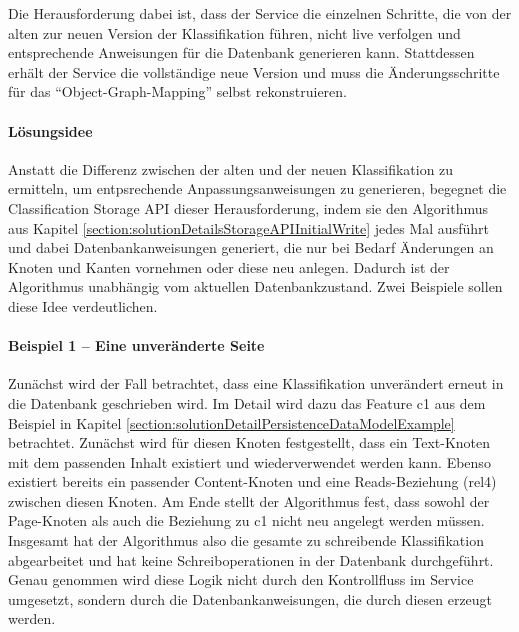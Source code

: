     Die Herausforderung dabei ist, dass der Service
    die einzelnen Schritte, die von der alten zur neuen Version der Klassifikation
    führen, nicht live verfolgen und entsprechende Anweisungen für die Datenbank generieren kann.
    Stattdessen erhält der Service die vollständige neue Version
    und muss die Änderungsschritte für das "`Object-Graph-Mapping"' selbst rekonstruieren.

    \paragraph{Lösungsidee}
    Anstatt die Differenz zwischen der alten und der neuen Klassifikation zu ermitteln,
    um entpsrechende Anpassungsanweisungen zu generieren,
    begegnet die Classification Storage API dieser Herausforderung,
    indem sie den Algorithmus aus Kapitel \ref{section:solutionDetailsStorageAPIInitialWrite}
    jedes Mal ausführt und dabei Datenbankanweisungen generiert,
    die nur bei Bedarf Änderungen an Knoten und Kanten vornehmen oder diese neu anlegen.
    Dadurch ist der Algorithmus unabhängig vom aktuellen Datenbankzustand.
    Zwei Beispiele sollen diese Idee verdeutlichen.

    \paragraph{Beispiel 1 -- Eine unveränderte Seite}
    Zunächst wird der Fall betrachtet, dass eine Klassifikation unverändert erneut in die Datenbank geschrieben wird.
    Im Detail wird dazu das Feature c1 aus dem Beispiel in Kapitel
    \ref{section:solutionDetailPersistenceDataModelExample} betrachtet.
    Zunächst wird für diesen Knoten festgestellt,
    dass ein Text-Knoten mit dem passenden Inhalt existiert und wiederverwendet werden kann.
    Ebenso existiert bereits ein passender Content-Knoten und eine Reads-Beziehung (rel4) zwischen diesen Knoten.
    Am Ende stellt der Algorithmus fest, dass sowohl der Page-Knoten als auch
    die Beziehung zu c1 nicht neu angelegt werden müssen.
    Insgesamt hat der Algorithmus also die gesamte zu schreibende Klassifikation abgearbeitet
    und hat keine Schreiboperationen in der Datenbank durchgeführt.
    Genau genommen wird diese Logik nicht durch den Kontrollfluss im Service umgesetzt,
    sondern durch die Datenbankanweisungen, die durch diesen erzeugt werden.

